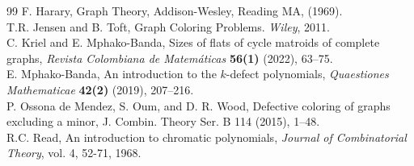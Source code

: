 \documentclass[12pt]{amsart}
\theoremstyle{definition}
\theoremstyle{remark}
\numberwithin{equation}{section}
\begin{document}
\begin{thebibliography}{99}
F. Harary, Graph Theory, Addison-Wesley, Reading MA, (1969).\\




 T.R. Jensen and B. Toft, Graph Coloring Problems. \textit{Wiley}, 2011.\\

 C. Kriel and E. Mphako-Banda, Sizes of flats of cycle matroids of complete graphs, \textit{Revista Colombiana de Matem\'aticas} \textbf{56(1)} (2022), 63--75.\\

 E. Mphako-Banda, An introduction to the $k$-defect polynomials, \textit{Quaestiones Mathematicae} \textbf{42(2)} (2019), 207--216.\\

  P. Ossona de Mendez, S. Oum, and D. R. Wood,
Defective coloring of graphs excluding a minor,
J. Combin. Theory Ser. B 114 (2015), 1–48. \\ %

 R.C. Read, An introduction to chromatic polynomials, \textit{Journal of Combinatorial Theory}, vol. 4, 52-71, 1968.\\

\end{thebibliography}
 
\end{document}
